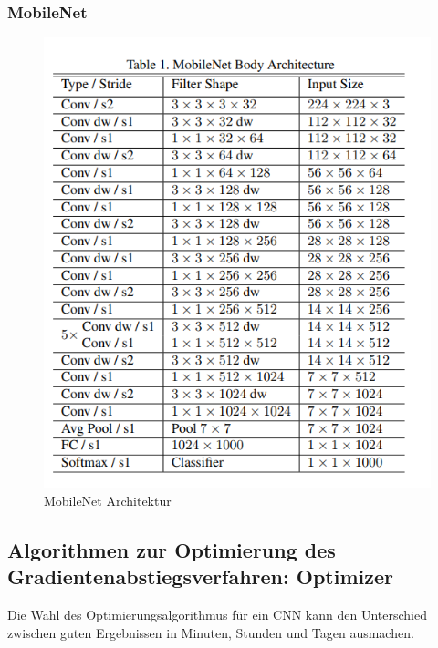 \documentclass[12pt,a4paper]{scrartcl}
\numberwithin{equation}{section}
\begin{document}
\subsubsection{MobileNet}
\begin{figure}[h]
	\centering
	\includegraphics[width=\textwidth,height=0.8\linewidth]{MobileNet}
	\caption{ MobileNet Architektur }
	\label{fig:MobileNet}
\end{figure}



\subsection{Algorithmen zur Optimierung des Gradientenabstiegsverfahren:	Optimizer}
Die Wahl des Optimierungsalgorithmus für ein \ac{CNN} kann den Unterschied zwischen guten Ergebnissen in Minuten, Stunden und Tagen ausmachen.
\end{document}
